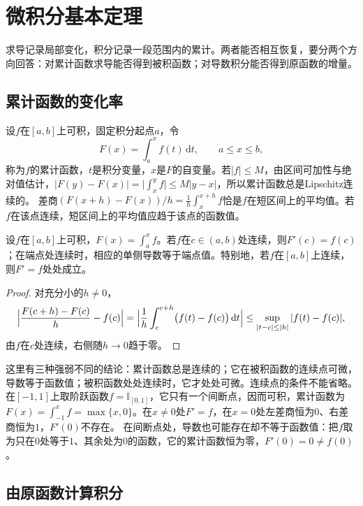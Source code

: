 \section{微积分基本定理}
\label{sec:ru-fundamental-theorem}

求导记录局部变化，积分记录一段范围内的累计。两者能否相互恢复，要分两个方向回答：对累计函数求导能否得到被积函数；对导数积分能否得到原函数的增量。

\subsection{累计函数的变化率}
\label{sec:ru-accumulation-derivative}

设$f$在$[a,b]$上可积，固定积分起点$a$，令
\[
 F(x)=\int_a^xf(t)\,\mathrm dt,\qquad a\leq x\leq b,
\]
称为$f$的累计函数，$t$是积分变量，$x$是$F$的自变量。若$|f|\leq M$，由区间可加性与绝对值估计，$|F(y)-F(x)|=\bigl|\int_x^yf\bigr|\leq M|y-x|$，所以累计函数总是Lipschitz连续的。
差商$(F(x+h)-F(x))/h=\frac1h\int_x^{x+h}f$恰是$f$在短区间上的平均值。若$f$在该点连续，短区间上的平均值应趋于该点的函数值。
\begin{theorem}[累计函数的导数]
\label{thm:ru-accumulation-derivative}
设$f$在$[a,b]$上可积，$F(x)=\int_a^xf$。若$f$在$c\in(a,b)$处连续，则$F'(c)=f(c)$；在端点处连续时，相应的单侧导数等于端点值。特别地，若$f$在$[a,b]$上连续，则$F'=f$处处成立。
\end{theorem}
\begin{proof}
对充分小的$h\neq0$，
\[
 \Bigl|\frac{F(c+h)-F(c)}h-f(c)\Bigr|=\Bigl|\frac1h\int_c^{c+h}\bigl(f(t)-f(c)\bigr)\,\mathrm dt\Bigr|\leq\sup_{|t-c|\leq|h|}|f(t)-f(c)|,
\]
由$f$在$c$处连续，右侧随$h\to0$趋于零。
\end{proof}
这里有三种强弱不同的结论：累计函数总是连续的；它在被积函数的连续点可微，导数等于函数值；被积函数处处连续时，它才处处可微。连续点的条件不能省略。
在$[-1,1]$上取阶跃函数$f=\mathbb I_{[0,1]}$，它只有一个间断点，因而可积，累计函数为$F(x)=\int_{-1}^xf=\max\{x,0\}$。在$x\neq0$处$F'=f$，在$x=0$处左差商恒为$0$、右差商恒为$1$，$F'(0)$不存在。
在间断点处，导数也可能存在却不等于函数值：把$f$取为只在$0$处等于$1$、其余处为$0$的函数，它的累计函数恒为零，$F'(0)=0\neq f(0)$。

\subsection{由原函数计算积分}
\label{sec:ru-newton-leibniz}

